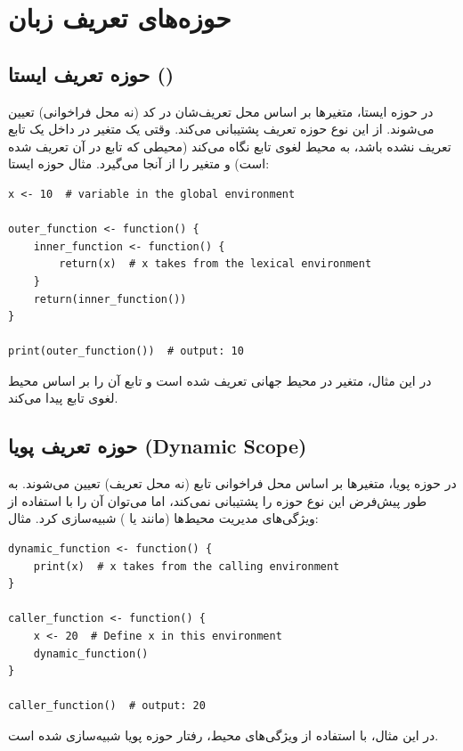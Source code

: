 \documentclass[11pt, a4paper, oneside]{book}
\begin{document}
			
		\section{حوزه‌های تعریف زبان}
		
			\subsection{حوزه تعریف ایستا ()}
			
				در حوزه ایستا، متغیرها بر اساس محل تعریف‌شان در کد (نه محل فراخوانی) تعیین می‌شوند.
				 از این نوع حوزه تعریف پشتیبانی می‌کند.
				وقتی یک متغیر در داخل یک تابع تعریف نشده باشد،  به محیط لغوی تابع نگاه می‌کند (محیطی که تابع در آن تعریف شده است) و متغیر را از آنجا می‌گیرد. مثال حوزه ایستا:
				
					\begin{latin}
						\begin{lstlisting}[caption={\lr{Static scope}}] 
x <- 10  # variable in the global environment

outer_function <- function() {
	inner_function <- function() {
		return(x)  # x takes from the lexical environment
	}
	return(inner_function())
}

print(outer_function())  # output: 10

						\end{lstlisting}
					\end{latin}
					
					در این مثال، متغیر  در محیط جهانی تعریف شده است و تابع  آن را بر اساس محیط لغوی تابع پیدا می‌کند.
			
			\subsection{حوزه تعریف پویا (Dynamic Scope)}
			
				در حوزه پویا، متغیرها بر اساس محل فراخوانی تابع (نه محل تعریف) تعیین می‌شوند.
				 به طور پیش‌فرض این نوع حوزه را پشتیبانی نمی‌کند، اما می‌توان آن را با استفاده از ویژگی‌های مدیریت محیط‌ها (مانند  یا ) شبیه‌سازی کرد. مثال:
			
			
					\begin{latin}
						\begin{lstlisting}[caption={\lr{Dynamic scope}}] 
dynamic_function <- function() {
	print(x)  # x takes from the calling environment
}

caller_function <- function() {
	x <- 20  # Define x in this environment
	dynamic_function()
}

caller_function()  # output: 20

						\end{lstlisting}
					\end{latin}
					در این مثال، با استفاده از ویژگی‌های محیط، رفتار حوزه پویا شبیه‌سازی شده است.
					
\end{document}
